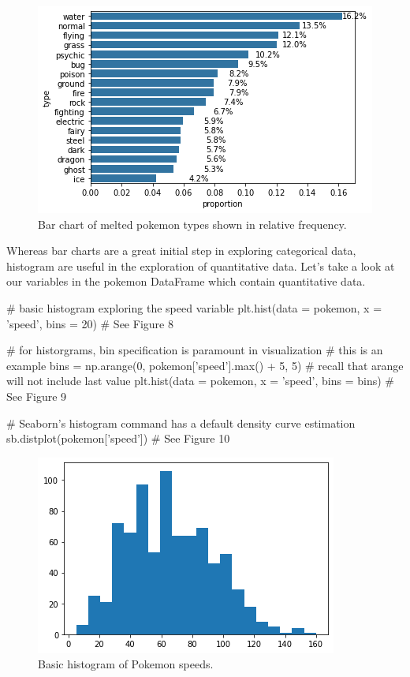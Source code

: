 \begin{figure}
	\includegraphics{images/figure7.png}
	\caption{Bar chart of melted pokemon types shown in relative frequency.}\label{fig:figure7}
\end{figure}

Whereas bar charts are a great initial step in exploring categorical data, histogram are useful in the exploration of quantitative data. Let's take a look at our variables in the pokemon DataFrame which contain quantitative data.

\begin{python}
	# basic histogram exploring the speed variable
	plt.hist(data = pokemon, x = 'speed', bins = 20)
	# See Figure 8
	
	# for historgrams, bin specification is paramount in visualization
	# this is an example
	bins = np.arange(0, pokemon['speed'].max() + 5, 5)
	# recall that arange will not include last value
	plt.hist(data = pokemon, x = 'speed', bins = bins)
	# See Figure 9
	
	# Seaborn's histogram command has a default density curve estimation
	sb.distplot(pokemon['speed'])
	# See Figure 10
	
\end{python}

\begin{figure}
	\includegraphics{images/figure8.png}
	\caption{Basic histogram of Pokemon speeds.}\label{fig:figure8}
\end{figure}

